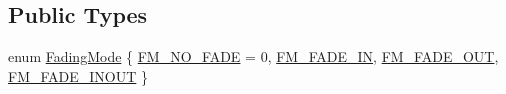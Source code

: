 \subsection*{Public Types}
\begin{DoxyCompactItemize}
\item 
enum \hyperlink{class_fading_scene_aac44cee699d9da962cfd083422808805}{FadingMode} \{ \hyperlink{class_fading_scene_aac44cee699d9da962cfd083422808805ade23a94dc2771731e41396ce29d8d599}{FM\_\-NO\_\-FADE} =  0, 
\hyperlink{class_fading_scene_aac44cee699d9da962cfd083422808805aa381e093a62a4bed2b5399915471cc7b}{FM\_\-FADE\_\-IN}, 
\hyperlink{class_fading_scene_aac44cee699d9da962cfd083422808805ac388465394f4da88a6d914281d1a4744}{FM\_\-FADE\_\-OUT}, 
\hyperlink{class_fading_scene_aac44cee699d9da962cfd083422808805ac4346adcfc9e9bf2d1f9cce304058912}{FM\_\-FADE\_\-INOUT}
 \}
\end{DoxyCompactItemize}
